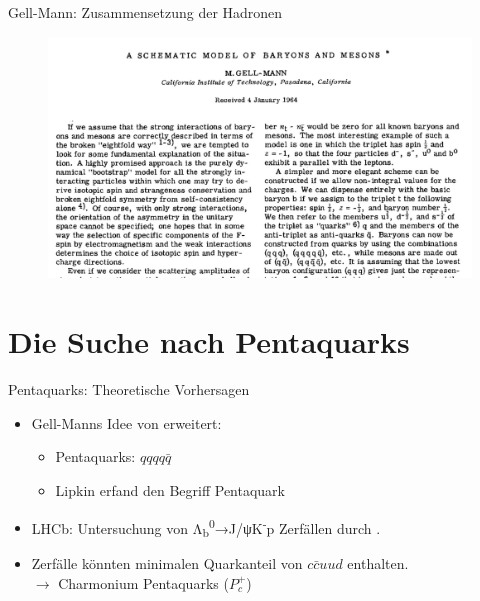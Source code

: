 \documentclass[aspectratio=169]{beamer} %
\begin{document}
    \begin{frame}{Gell-Mann: Zusammensetzung der Hadronen}
      \begin{figure}\includegraphics[height=0.85\textheight, width=\textwidth, keepaspectratio]{Images/8ad56d13-e301-4a37-be9c-7077ac16ce16.jpg}\\\small\cite[S.~214]{GellMann.1964}\end{figure}
        \end{frame}

    \section{Die Suche nach Pentaquarks}

    \begin{frame}{Pentaquarks: Theoretische Vorhersagen}
      \begin{itemize}
        \item Gell-Manns Idee von \textcite{Hogaasen.1978,Strottman.1979} erweitert:
        \begin{itemize}
          \item Pentaquarks: $qqqq\bar{q}$
          \item Lipkin erfand den Begriff Pentaquark \parencite{Lipkin.1987}
        \end{itemize}
        \item LHCb: Untersuchung von Λ\textsubscript{b}\textsuperscript{0}→J/ψK\textsuperscript{-}p Zerfällen durch \textcite{Aaij.2015}.
        \item Zerfälle könnten minimalen Quarkanteil von $c\bar{c}uud$ enthalten. \\ $\rightarrow$ Charmonium Pentaquarks ($P_c^+$)
      \end{itemize}
    \end{frame}
\end{document}
